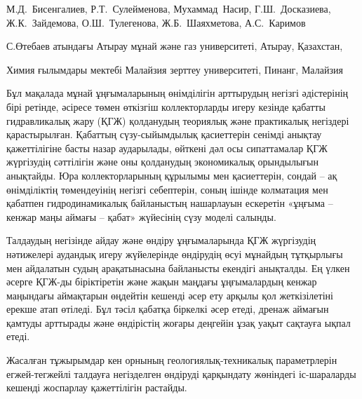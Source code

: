 
\begin{header}

М.Д.~Бисенгалиев\envelope,
Р.Т.~Сулейменова,
Мухаммад~Насир,
Г.Ш.~Досказиева,
Ж.К.~Зайдемова,
О.Ш.~Тулегенова,
Ж.Б.~Шаяхметова,
А.С.~Каримов
\end{header}

\begin{affil}
С.Өтебаев атындағы Атырау мұнай және газ университеті, Атырау, Қазахстан,

Химия ғылымдары мектебі Малайзия зерттеу университеті, Пинанг, Малайзия

\end{affil}

Бұл мақалада мұнай ұңғымаларының өнімділігін арттырудың негізгі
әдістерінің бірі ретінде, әсіресе төмен өткізгіш коллекторларды игеру
кезінде қабатты гидравликалық жару (ҚГЖ) қолданудың теориялық және
практикалық негіздері қарастырылған. Қабаттың сүзу-сыйымдылық
қасиеттерін сенімді анықтау қажеттілігіне басты назар аударылады,
өйткені дәл осы сипаттамалар ҚГЖ жүргізудің сәттілігін және оны
қолданудың экономикалық орындылығын анықтайды. Юра коллекторларының
құрылымы мен қасиеттерін, сондай -- ақ өнімділіктің төмендеуінің негізгі
себептерін, соның ішінде колматация мен қабатпен гидродинамикалық
байланыстың нашарлауын ескеретін «ұңғыма -- кенжар маңы аймағы -- қабат»
жүйесінің сүзу моделі салынды.

Талдаудың негізінде айдау және өндіру ұңғымаларында ҚГЖ жүргізудің
нәтижелері аудандық игеру жүйелерінде өндірудің өсуі мұнайдың тұтқырлығы
мен айдалатын судың арақатынасына байланысты екендігі анықталды. Ең
үлкен әсерге ҚГЖ-ды біріктіретін және жақын маңдағы ұңғымалардың кенжар
маңындағы аймақтарын өңдейтін кешенді әсер ету арқылы қол жеткізілетіні
ерекше атап өтіледі. Бұл тәсіл қабатқа біркелкі әсер етеді, дренаж
аймағын қамтуды арттырады және өндірістің жоғары деңгейін ұзақ уақыт
сақтауға ықпал етеді.

Жасалған тұжырымдар кен орнының геологиялық-техникалық параметрлерін
егжей-тегжейлі талдауға негізделген өндіруді қарқындату жөніндегі
іс-шараларды кешенді жоспарлау қажеттілігін растайды.

